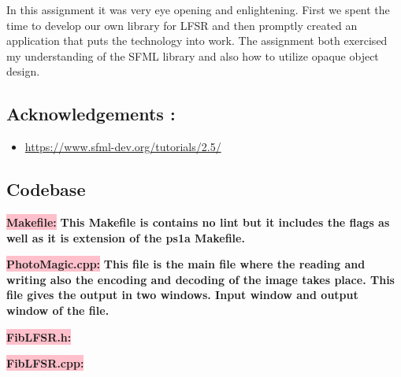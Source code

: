 In this assignment it was very eye opening and enlightening. First we spent the time to develop our own library for LFSR and then promptly created an application that puts the technology into work. The assignment both exercised my understanding of the SFML library and also how to utilize opaque object design. 


\subsection{Acknowledgements :}\label{sec:ps1b:ack}
\begin{itemize}
    \item \url{https://www.sfml-dev.org/tutorials/2.5/}
\end{itemize}
\newpage

\subsection{Codebase}\label{sec:ps1b:code}

\colorbox{pink}{\textbf{Makefile:}} \newline \textbf{This Makefile is contains no lint but it includes the flags as well as it is extension of the ps1a Makefile.}





\colorbox{pink}{\textbf{PhotoMagic.cpp:}} \newline \textbf{This file is the main file where the reading and writing also the encoding and decoding of the image takes place. This file gives the output in two windows. Input window and output window of the file.}



\colorbox{pink}{\textbf{FibLFSR.h:}}


\colorbox{pink}{\textbf{FibLFSR.cpp:}}



